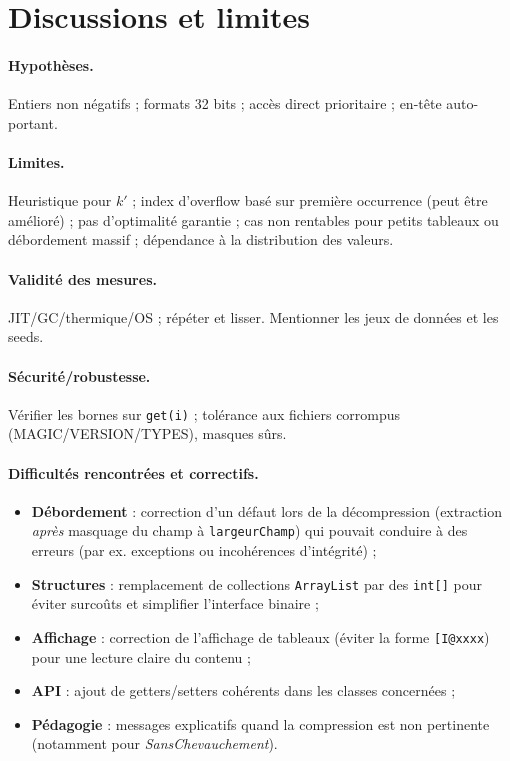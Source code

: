 \section{Discussions et limites}
\label{sec:discussion}

\paragraph{Hypothèses.} Entiers non négatifs ; formats 32 bits ; accès direct prioritaire ; en-tête auto-portant.
\paragraph{Limites.} Heuristique pour $k'$ ; index d'overflow basé sur première occurrence (peut être amélioré) ; pas d'optimalité garantie ; cas non rentables pour petits tableaux ou débordement massif ; dépendance à la distribution des valeurs.
\paragraph{Validité des mesures.} JIT/GC/thermique/OS ; répéter et lisser. Mentionner les jeux de données et les seeds.
\paragraph{Sécurité/robustesse.} Vérifier les bornes sur \verb|get(i)| ; tolérance aux fichiers corrompus (MAGIC/VERSION/TYPES), masques sûrs.

\paragraph{Difficultés rencontrées et correctifs.}
\begin{itemize}
	\item \textbf{Débordement} : correction d'un défaut lors de la décompression (extraction \emph{après} masquage du champ à \texttt{largeurChamp}) qui pouvait conduire à des erreurs (par ex. exceptions ou incohérences d'intégrité) ;
	\item \textbf{Structures} : remplacement de collections \texttt{ArrayList} par des \texttt{int[]} pour éviter surcoûts et simplifier l'interface binaire ;
	\item \textbf{Affichage} : correction de l'affichage de tableaux (éviter la forme \verb|[I@xxxx|) pour une lecture claire du contenu ;
	\item \textbf{API} : ajout de getters/setters cohérents dans les classes concernées ;
	\item \textbf{Pédagogie} : messages explicatifs quand la compression est non pertinente (notamment pour \emph{SansChevauchement}).
\end{itemize}
